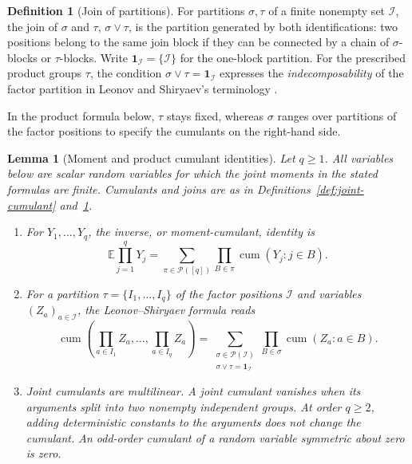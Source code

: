 \documentclass[11pt]{article}
\newtheorem{lemma}[theorem]{Lemma}
\theoremstyle{definition}
\newtheorem{definition}{Definition}[section]
\theoremstyle{remark}
\theoremstyle{plain}
\newcommand{\E}{\mathbb E}
\newcommand{\one}{\mathbf 1}
\DeclareMathOperator{\cum}{cum}
\begin{document}
\begin{definition}[Join of partitions]\label{def:partition-join}
For partitions $\sigma,\tau$ of a finite nonempty set $\mathcal I$,
the join of $\sigma$ and $\tau$,
$\sigma\vee\tau$, is the partition generated by both identifications:
two positions belong to the same join block if they can be
connected by a chain of $\sigma$-blocks or $\tau$-blocks.
Write $\one_{\mathcal I}=\{\mathcal I\}$ for the one-block partition.
For the prescribed product groups $\tau$, the condition
$\sigma\vee\tau=\one_{\mathcal I}$ expresses the
\emph{indecomposability} of the factor partition in
Leonov and Shiryaev's terminology
\cite[Remark~5, p.~323]{leonov_shiryaev1959}.
\end{definition}

In the product formula below, $\tau$ stays fixed, whereas $\sigma$
ranges over partitions of the factor positions to specify the
cumulants on the right-hand side.

\begin{lemma}[Moment and product cumulant identities]
\label{lem:cumulant-identities}
Let $q\ge1$. All variables below are scalar random variables for
which the joint moments in the stated formulas are finite.
Cumulants and joins are as in Definitions~\ref{def:joint-cumulant}
and~\ref{def:partition-join}.
\begin{enumerate}
\item For $Y_1,\ldots,Y_q$, the inverse, or moment-cumulant,
identity \cite[Eq.~(I.c), p.~321]{leonov_shiryaev1959} is
\begin{equation}\label{eq:moment-cumulant}
 \E\prod_{j=1}^qY_j
    =\sum_{\pi\in\mathcal P([q])}
       \prod_{B\in\pi}\cum(Y_j:j\in B).
\end{equation}
\item For a partition $\tau=\{I_1,\ldots,I_q\}$ of the factor
positions $\mathcal I$ and variables $(Z_a)_{a\in\mathcal I}$,
the Leonov--Shiryaev formula
\cite[Eq.~(IV.d), p.~323]{leonov_shiryaev1959}
reads
\begin{equation}\label{eq:product-cumulant}
 \cum\left(\prod_{a\in I_1}Z_a,\ldots,
                 \prod_{a\in I_q}Z_a\right)
 =\sum_{\substack{\sigma\in\mathcal P(\mathcal I)\\
                    \sigma\vee\tau=\one_{\mathcal I}}}
       \prod_{B\in\sigma}\cum(Z_a:a\in B).
\end{equation}
\item Joint cumulants are multilinear. A joint cumulant vanishes
when its arguments split into two nonempty independent groups.
At order $q\ge2$, adding deterministic constants to the arguments
does not change the cumulant. An odd-order cumulant of a random
variable symmetric about zero is zero.
\end{enumerate}
\end{lemma}
\end{document}
